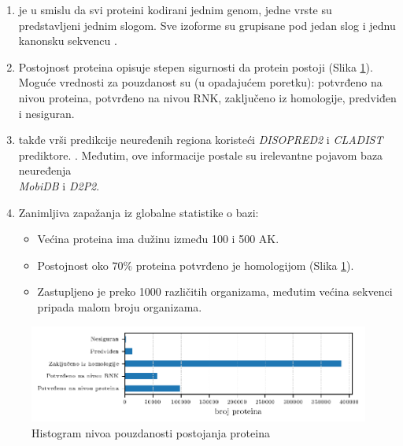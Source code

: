\begin{enumerate}
  \item
    \label{red}
    \swissprot je  u smislu da svi proteini
    kodirani jednim genom, jedne vrste su predstavljeni jednim slogom. Sve
    izoforme su grupisane pod jedan slog i jednu kanonsku sekvencu \parencite{nonRedundant}.

  \item Postojnost proteina   opisuje stepen
    sigurnosti da protein postoji (Slika \ref{fig:PE}). Moguće vrednosti za pouzdanost su (u opadajućem poretku):
    potvrđeno na nivou proteina, potvrđeno na nivou RNK, zaključeno iz homologije, predviđen i nesiguran. 

  \clearpage


  \item
    \swissprot takđe vrši predikcije neuređenih regiona koristeći \textit{DISOPRED2}
    i \textit{CLADIST} prediktore. \parencite{Meng_c2017}. Međutim, ove informacije
    postale su irelevantne pojavom baza neuređenja \\ \textit{MobiDB}\parencite{Piovesan2017} i \textit{D2P2}\parencite{Oates2012}.

  \item Zanimljiva zapažanja iz globalne statistike o \swissprot bazi:
    \begin{itemize}
      \item Većina proteina ima dužinu između 100 i 500 AK.
      \item Postojnost oko $70\%$ proteina potvrđeno je homologijom (Slika \ref{fig:PE}).
      \item Zastupljeno je preko 1000 različitih organizama, međutim
        većina \swissprot sekvenci pripada malom broju organizama.
    \end{itemize}
      


\end{enumerate}

\begin{figure}[h!]
  \centering
  \hspace*{-1cm} 
  \includegraphics[]{plots/PE.pdf}
  \caption{Histogram nivoa pouzdanosti postojanja \swissprot proteina}
  \label{fig:PE}
\end{figure}

%
%
%













